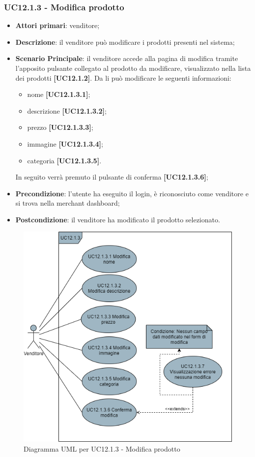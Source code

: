 \subsubsection{UC12.1.3 - Modifica prodotto}
\begin{itemize}
\item \textbf{Attori primari}: venditore;
\item \textbf{Descrizione}: il venditore può modificare i prodotti presenti nel sistema;
\item \textbf{Scenario Principale}: il venditore accede alla pagina di modifica tramite l'apposito pulsante collegato al prodotto da modificare, visualizzato nella lista dei prodotti \textbf{[UC12.1.2]}. Da li può modificare le seguenti informazioni:
\begin{itemize}
	\item nome \textbf{[UC12.1.3.1]};
	\item descrizione \textbf{[UC12.1.3.2]};
	\item prezzo \textbf{[UC12.1.3.3]};
	\item immagine \textbf{[UC12.1.3.4]};
	\item categoria \textbf{[UC12.1.3.5]}.
\end{itemize}
In seguito verrà premuto il pulsante di conferma \textbf{[UC12.1.3.6]};
\item \textbf{Precondizione}: l'utente ha eseguito il login, è riconosciuto come venditore e si trova nella merchant dashboard;
\item \textbf{Postcondizione}: il venditore ha modificato il prodotto selezionato.
\end{itemize}

\begin{figure}[H]
\centering
\includegraphics[scale=0.6]{res/UseCase/Immagini/ModificaProdotto}
\caption{Diagramma UML per UC12.1.3 - Modifica prodotto}
\end{figure}

